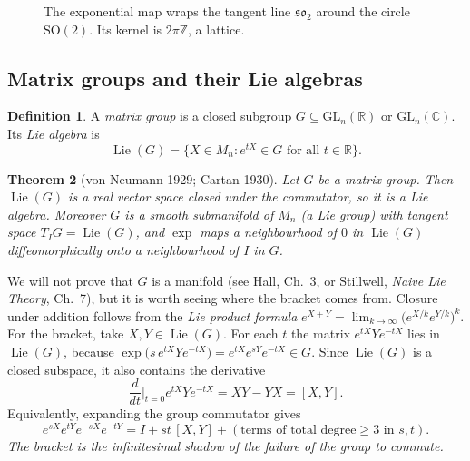 \documentclass[11pt,openany]{book}
\theoremstyle{plain}
\newtheorem{theorem}{Theorem}[chapter]
\theoremstyle{definition}
\newtheorem{definition}[theorem]{Definition}
\theoremstyle{remark}
\newcommand{\R}{\mathbb{R}}
\newcommand{\Z}{\mathbb{Z}}
\newcommand{\C}{\mathbb{C}}
\newcommand{\Sph}{\mathbb{S}}          %
\newcommand{\GL}{\mathrm{GL}}
\newcommand{\SO}{\mathrm{SO}}
\begin{document}
\begin{figure}[ht]
\centering
{}
\caption{The exponential map wraps the tangent line $\mathfrak{so}_2$ around the circle $\SO(2)$.
Its kernel is $2\pi\Z$, a lattice.}
\label{LIE:fig:so2}
\end{figure}

\subsection*{Matrix groups and their Lie algebras}

\begin{definition}
A \emph{matrix group} is a closed subgroup $G\subseteq\GL_n(\R)$ or $\GL_n(\C)$. Its \emph{Lie algebra} is
\[
  \operatorname{Lie}(G)=\{X\in M_n: e^{tX}\in G\text{ for all }t\in\R\}.
\]
\end{definition}

\begin{theorem}[von Neumann 1929; Cartan 1930]\label{LIE:thm:closed}
Let $G$ be a matrix group. Then $\operatorname{Lie}(G)$ is a real vector space closed under the commutator,
so it is a Lie algebra. Moreover $G$ is a smooth submanifold of $M_n$ (a \emph{Lie group}) with tangent
space $T_IG=\operatorname{Lie}(G)$, and $\exp$ maps a neighbourhood of $0$ in $\operatorname{Lie}(G)$
diffeomorphically onto a neighbourhood of $I$ in $G$.
\end{theorem}

We will not prove that $G$ is a manifold (see Hall, Ch.~3, or Stillwell, \emph{Naive Lie Theory}, Ch.~7), but it is worth seeing where the bracket comes from. Closure under addition follows from the
\emph{Lie product formula} $e^{X+Y}=\lim_{k\to\infty}\big(e^{X/k}e^{Y/k}\big)^k$. For the bracket, take
$X,Y\in\operatorname{Lie}(G)$. For each $t$ the matrix $e^{tX}Ye^{-tX}$ lies in $\operatorname{Lie}(G)$, because
$\exp\!\big(s\,e^{tX}Ye^{-tX}\big)=e^{tX}e^{sY}e^{-tX}\in G$. Since $\operatorname{Lie}(G)$ is a closed
subspace, it also contains the derivative
\[
  \frac{d}{dt}\Big|_{t=0}e^{tX}Ye^{-tX}=XY-YX=[X,Y].
\]
Equivalently, expanding the group commutator gives
\[
  e^{sX}e^{tY}e^{-sX}e^{-tY}=I+st\,[X,Y]+(\text{terms of total degree}\ge3\text{ in }s,t).
\]
\emph{The bracket is the infinitesimal shadow of the failure of the group to commute.}
\end{document}
